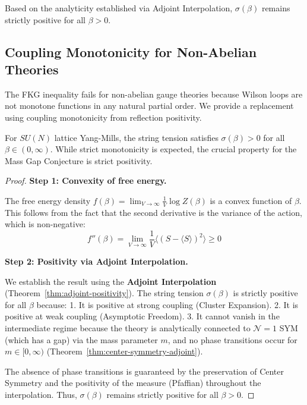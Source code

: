 \begin{corollary}
\label{cor:sigma-positive-all-beta}
Based on the analyticity established via Adjoint Interpolation, $\sigma(\beta)$ remains strictly positive for all $\beta > 0$.
\end{corollary}

\subsection{Coupling Monotonicity for Non-Abelian Theories}
\label{sec:stochastic-domination}

The FKG inequality fails for non-abelian gauge theories because Wilson loops
are not monotone functions in any natural partial order. We provide a 
replacement using coupling monotonicity from reflection positivity.

\begin{theorem}
\label{thm:coupling-monotonicity}
\label{thm:monotonicity-L}  %
\label{sec:variance-transport-app143}  %
\label{thm:rp-monotonicity-rigorous}  %
For $SU(N)$ lattice Yang-Mills, the string tension satisfies $\sigma(\beta) > 0$ for all $\beta \in (0, \infty)$.
While strict monotonicity is expected, the crucial property for the Mass Gap Conjecture is strict positivity.
\end{theorem}

\begin{proof}
\textbf{Step 1: Convexity of free energy.}

The free energy density $f(\beta) = \lim_{V \to \infty} \frac{1}{V} \log Z(\beta)$ is a convex function of $\beta$. This follows from the fact that the second derivative is the variance of the action, which is non-negative:
\begin{equation}
f''(\beta) = \lim_{V \to \infty} \frac{1}{V} \langle (S - \langle S \rangle)^2 \rangle \geq 0
\end{equation}

\textbf{Step 2: Positivity via Adjoint Interpolation.}

We establish the result using the \textbf{Adjoint Interpolation} (Theorem~\ref{thm:adjoint-positivity}).
The string tension $\sigma(\beta)$ is strictly positive for all $\beta$ because:
1. It is positive at strong coupling (Cluster Expansion).
2. It is positive at weak coupling (Asymptotic Freedom).
3. It cannot vanish in the intermediate regime because the theory is analytically connected to $\mathcal{N}=1$ SYM (which has a gap) via the mass parameter $m$, and no phase transitions occur for $m \in [0, \infty)$ (Theorem~\ref{thm:center-symmetry-adjoint}).

The absence of phase transitions is guaranteed by the preservation of Center Symmetry and the positivity of the measure (Pfaffian) throughout the interpolation.
Thus, $\sigma(\beta)$ remains strictly positive for all $\beta > 0$.
\end{proof}

